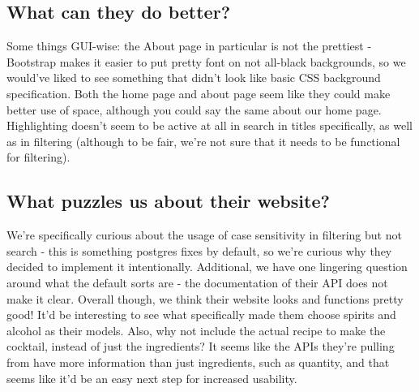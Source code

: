 \documentclass{scrartcl}
\begin{document}
    \subsection*{What can they do better?}
    Some things GUI-wise: the About page in particular is not the prettiest - Bootstrap makes it easier to put pretty font on not all-black backgrounds, so we would've liked to see something that didn't look like basic CSS background specification. Both the home page and about page seem like they could make better use of space, although you could say the same about our home page. Highlighting doesn't seem to be active at all in search in titles specifically, as well as in filtering (although to be fair, we're not sure that it needs to be functional for filtering).
    \subsection*{What puzzles us about their website?}
    We're specifically curious about the usage of case sensitivity in filtering but not search - this is something postgres fixes by default, so we're curious why they decided to implement it intentionally. Additional, we have one lingering question around what the default sorts are - the documentation of their API does not make it clear. Overall though, we think their website looks and functions pretty good! It'd be interesting to see what specifically made them choose spirits and alcohol as their models. Also, why not include the actual recipe to make the cocktail, instead of just the ingredients? It seems like the APIs they're pulling from have more information than just ingredients, such as quantity, and that seems like it'd be an easy next step for increased usability.
\end{document}
